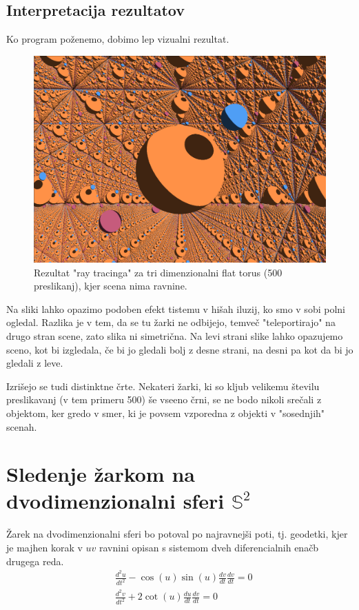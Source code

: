\documentclass[titlepage]{article}
\begin{document}
\subsection{Interpretacija rezultatov}
Ko program poženemo, dobimo lep vizualni rezultat.
\begin{figure}[H]
    \centering
    \includegraphics[width=0.7\linewidth]{Images/flat_torus_24mm_500.png}
    \caption{Rezultat "ray tracinga" za tri dimenzionalni flat torus (500 preslikanj), kjer scena nima ravnine.}
    \label{Slika:Rezultat "ray tracinga" za tri dimenzionalni flat torus}
\end{figure}
Na sliki lahko opazimo podoben efekt tistemu v hišah iluzij, ko smo v sobi polni ogledal. Razlika je v tem, 
da se tu žarki ne odbijejo, temveč "teleportirajo" na drugo stran scene, zato slika ni simetrična. Na levi strani slike 
lahko opazujemo sceno, kot bi izgledala, če bi jo gledali bolj z desne strani, na desni pa kot da bi jo gledali z leve.

Izrišejo se tudi distinktne črte. Nekateri žarki, ki so kljub velikemu številu preslikavanj
(v tem primeru 500) še vseeno črni, se ne bodo nikoli srečali z objektom, ker gredo v smer, ki je povsem vzporedna
z objekti v "sosednjih" scenah.

\section{\texorpdfstring{Sledenje žarkom na dvodimenzionalni sferi \( \mathbb{S}^2 \)}{Sledenje žarkom na dvodimenzionalni sferi}}
Žarek na dvodimenzionalni sferi bo potoval po najravnejši poti, tj. geodetki, kjer je majhen korak v \( uv \) ravnini opisan s sistemom dveh diferencialnih enačb drugega reda.
\begin{equation}
    \begin{split}
        &\frac{d^{2}u}{dt^{2}}-\cos(u)\sin(u)\frac{dv}{dt}\frac{dv}{dt}=0 \\
        &\frac{d^{2}v}{dt^{2}}+2\cot(u)\frac{du}{dt}\frac{dv}{dt}=0
    \end{split}
\end{equation}
\end{document}
